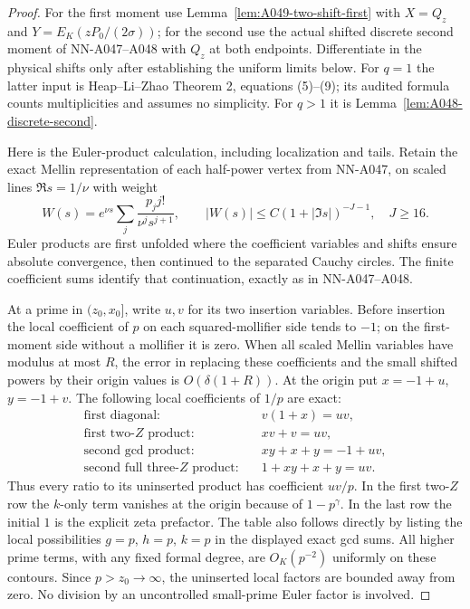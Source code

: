 \begin{proof}
For the first moment use Lemma~\ref{lem:A049-two-shift-first}
with $X=Q_z$ and $Y=E_K(zP_0/(2\sigma))$; for the second use
the actual shifted discrete second moment of NN-A047--A048 with
$Q_z$ at both endpoints. Differentiate in the physical shifts
only after establishing the uniform limits below. For $q=1$
the latter input is Heap--Li--Zhao Theorem 2, equations (5)--(9);
its audited formula counts multiplicities and assumes no
simplicity. For $q>1$ it is
Lemma~\ref{lem:A048-discrete-second}.

Here is the Euler-product calculation, including localization
and tails. Retain the exact Mellin representation of each
half-power vertex from NN-A047, on scaled lines
$\Re s=1/\nu$ with weight
\[
 W(s)=e^{\nu s}\sum_j\frac{p_jj!}{\nu^j s^{j+1}},
 \qquad |W(s)|\le C(1+|\Im s|)^{-J-1},\quad J\ge16.
\tag{A049g.13}
\]
Euler products are first unfolded where the coefficient variables
and shifts ensure absolute convergence, then continued to the
separated Cauchy circles. The finite coefficient sums identify
that continuation, exactly as in NN-A047--A048.

At a prime in $(z_0,x_0]$, write $u,v$ for its two insertion
variables. Before insertion the local coefficient of $p$ on
each squared-mollifier side tends to $-1$; on the first-moment
side without a mollifier it is zero. When all scaled Mellin
variables have modulus at most $R$, the error in replacing
these coefficients and the small shifted powers by their origin
values is $O(\delta(1+R))$. At the origin put
$x=-1+u$, $y=-1+v$. The following local coefficients of
$1/p$ are exact:
\[
 \begin{aligned}
 \text{first diagonal:}&\quad v(1+x)=uv,\\
 \text{first two-}Z\text{ product:}&\quad xv+v=uv,\\
 \text{second gcd product:}&\quad xy+x+y=-1+uv,\\
 \text{second full three-}Z\text{ product:}&\quad
                                    1+xy+x+y=uv.
 \end{aligned}
\tag{A049g.14}
\]
Thus every ratio to its uninserted product has coefficient
$uv/p$. In the first two-$Z$ row the $k$-only term vanishes
at the origin because of $1-p^\gamma$. In the last row the
initial $1$ is the explicit zeta prefactor. The table also
follows directly by listing the local possibilities $g=p$,
$h=p$, $k=p$ in the displayed exact gcd sums. All higher prime
terms, with any fixed formal degree, are $O_K(p^{-2})$ uniformly
on these contours. Since $p>z_0\to\infty$, the uninserted
local factors are bounded away from zero. No division by an
uncontrolled small-prime Euler factor is involved.


\end{proof}
